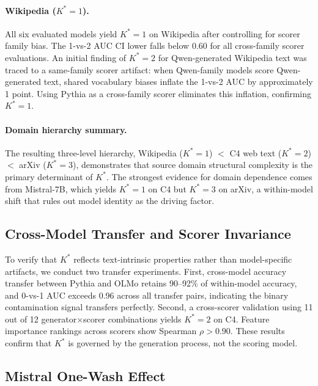 \documentclass[11pt,a4paper]{article}
\newcommand{\Kstar}{K^{*}}
\begin{document}
\paragraph{Wikipedia ($\Kstar = 1$).} All six evaluated models yield $\Kstar = 1$ on Wikipedia after controlling for scorer family bias. The 1-vs-2 AUC CI lower falls below 0.60 for all cross-family scorer evaluations. An initial finding of $\Kstar = 2$ for Qwen-generated Wikipedia text was traced to a same-family scorer artifact: when Qwen-family models score Qwen-generated text, shared vocabulary biases inflate the 1-vs-2 AUC by approximately 1 point. Using Pythia as a cross-family scorer eliminates this inflation, confirming $\Kstar = 1$.

\paragraph{Domain hierarchy summary.} The resulting three-level hierarchy, Wikipedia ($\Kstar = 1$) $<$ C4 web text ($\Kstar = 2$) $<$ arXiv ($\Kstar = 3$), demonstrates that source domain structural complexity is the primary determinant of $\Kstar$. The strongest evidence for domain dependence comes from Mistral-7B, which yields $\Kstar = 1$ on C4 but $\Kstar = 3$ on arXiv, a within-model shift that rules out model identity as the driving factor.

\subsection{Cross-Model Transfer and Scorer Invariance}
\label{sec:cross-model}

To verify that $\Kstar$ reflects text-intrinsic properties rather than model-specific artifacts, we conduct two transfer experiments. First, cross-model accuracy transfer between Pythia and OLMo retains 90--92\% of within-model accuracy, and 0-vs-1 AUC exceeds 0.96 across all transfer pairs, indicating the binary contamination signal transfers perfectly. Second, a cross-scorer validation using 11 out of 12 generator$\times$scorer combinations yields $\Kstar = 2$ on C4. Feature importance rankings across scorers show Spearman $\rho > 0.90$. These results confirm that $\Kstar$ is governed by the generation process, not the scoring model.

\subsection{Mistral One-Wash Effect}
\label{sec:mistral}
\end{document}

